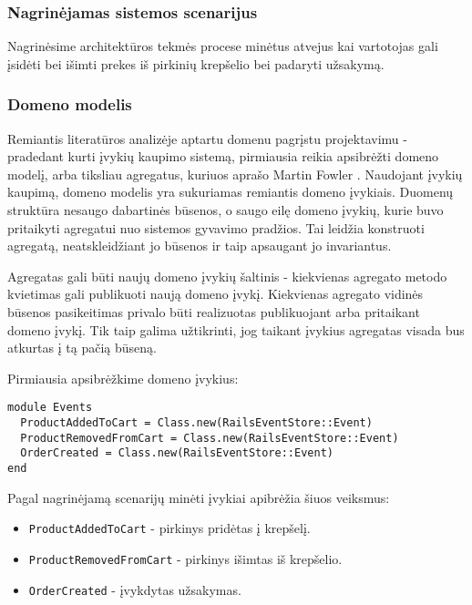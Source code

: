 \subsubsection{Nagrinėjamas sistemos scenarijus}

Nagrinėsime architektūros tekmės procese minėtus atvejus kai vartotojas gali įsidėti bei išimti prekes iš pirkinių krepšelio bei padaryti užsakymą.

\subsubsection{Domeno modelis}

Remiantis literatūros analizėje aptartu domenu pagrįstu projektavimu - pradedant kurti įvykių kaupimo sistemą, pirmiausia reikia apsibrėžti domeno modelį, arba tiksliau agregatus, kuriuos aprašo Martin Fowler \cite{Fowler:Aggregate}. Naudojant įvykių kaupimą, domeno modelis yra sukuriamas remiantis domeno įvykiais. Duomenų struktūra nesaugo dabartinės būsenos, o saugo eilę domeno įvykių, kurie buvo pritaikyti agregatui nuo sistemos gyvavimo pradžios. Tai leidžia konstruoti agregatą, neatskleidžiant jo būsenos ir taip apsaugant jo invariantus.

Agregatas gali būti naujų domeno įvykių šaltinis - kiekvienas agregato metodo kvietimas gali publikuoti naują domeno įvykį. Kiekvienas agregato vidinės būsenos pasikeitimas privalo būti realizuotas publikuojant arba pritaikant domeno įvykį. Tik taip galima užtikrinti, jog taikant įvykius agregatas visada bus atkurtas į tą pačią būseną.

Pirmiausia apsibrėžkime domeno įvykius:

\begin{lstlisting}[]
module Events
  ProductAddedToCart = Class.new(RailsEventStore::Event)
  ProductRemovedFromCart = Class.new(RailsEventStore::Event)
  OrderCreated = Class.new(RailsEventStore::Event)
end
\end{lstlisting}

Pagal nagrinėjamą scenarijų minėti įvykiai apibrėžia šiuos veiksmus:

\begin{itemize}
  \item \lstinline|ProductAddedToCart| - pirkinys pridėtas į krepšelį.
  \item \lstinline|ProductRemovedFromCart| - pirkinys išimtas iš krepšelio.
  \item \lstinline|OrderCreated| - įvykdytas užsakymas.
\end{itemize}

